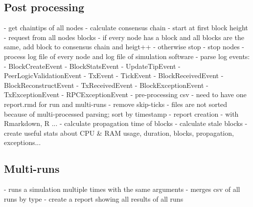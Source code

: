 \subsection{Post processing}
 - get chaintips of all nodes
 - calculate consensus chain
   - start at first block height
   - request from all nodes blocks
   - if every node has a block and all blocks are the same, add block to consensus chain and heigt++
   - otherwise stop
 - stop nodes
 - process log file of every node and log file of simulation software
 - parse log events:
   - BlockCreateEvent
   - BlockStatsEvent
   - UpdateTipEvent
   - PeerLogicValidationEvent
   - TxEvent
   - TickEvent
   - BlockReceivedEvent
   - BlockReconstructEvent
   - TxReceivedEvent
   - BlockExceptionEvent
   - TxExceptionEvent
   - RPCExceptionEvent
 - pre-processing csv
   - need to have one report.rmd for run and multi-runs
   - remove skip-ticks
   - files are not sorted because of multi-processed parsing; sort by timestamp 
 - report creation
   - with Rmarkdown, R ...
   - calculate propagation time of blocks
   - calculate stale blocks
   - create useful stats about CPU \& RAM usage, duration, blocks, propagation, exceptions...
   
\subsection{Multi-runs}
 - runs a simulation multiple times with the same arguments
 - merges csv of all runs by type
 - create a report showing all results of all runs